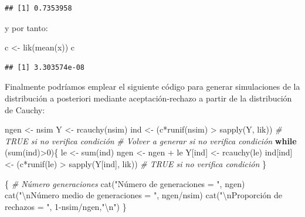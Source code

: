 \documentclass[
]{book}
\newenvironment{Shaded}{\begin{snugshade}}{\end{snugshade}}
\newcommand{\CommentTok}[1]{\textcolor[rgb]{0.56,0.35,0.01}{\textit{#1}}}
\newcommand{\ControlFlowTok}[1]{\textcolor[rgb]{0.13,0.29,0.53}{\textbf{#1}}}
\newcommand{\DecValTok}[1]{\textcolor[rgb]{0.00,0.00,0.81}{#1}}
\newcommand{\FunctionTok}[1]{\textcolor[rgb]{0.00,0.00,0.00}{#1}}
\newcommand{\NormalTok}[1]{#1}
\newcommand{\OtherTok}[1]{\textcolor[rgb]{0.56,0.35,0.01}{#1}}
\newcommand{\SpecialCharTok}[1]{\textcolor[rgb]{0.00,0.00,0.00}{#1}}
\newcommand{\StringTok}[1]{\textcolor[rgb]{0.31,0.60,0.02}{#1}}
\theoremstyle{break}
\theoremstyle{definition}
\theoremstyle{definition}
\theoremstyle{definition}
\theoremstyle{definition}
\theoremstyle{remark}
\begin{document}
\begin{enumerate}
\begin{verbatim}
## [1] 0.7353958
\end{verbatim}

  y por tanto:

\begin{Shaded}
\begin{Highlighting}[]
\NormalTok{c }\OtherTok{\textless{}{-}} \FunctionTok{lik}\NormalTok{(}\FunctionTok{mean}\NormalTok{(x))}
\NormalTok{c    }
\end{Highlighting}
\end{Shaded}

\begin{verbatim}
## [1] 3.303574e-08
\end{verbatim}

  Finalmente podríamos emplear el siguiente código para generar simulaciones de la distribución a posteriori mediante aceptación-rechazo a partir de la distribución de Cauchy:

\begin{Shaded}
\begin{Highlighting}[]
\NormalTok{ngen }\OtherTok{\textless{}{-}}\NormalTok{ nsim}
\NormalTok{Y }\OtherTok{\textless{}{-}} \FunctionTok{rcauchy}\NormalTok{(nsim)}
\NormalTok{ind }\OtherTok{\textless{}{-}}\NormalTok{ (c}\SpecialCharTok{*}\FunctionTok{runif}\NormalTok{(nsim) }\SpecialCharTok{\textgreater{}} \FunctionTok{sapply}\NormalTok{(Y, lik)) }\CommentTok{\# TRUE si no verifica condición}
\CommentTok{\# Volver a generar si no verifica condición}
\ControlFlowTok{while}\NormalTok{ (}\FunctionTok{sum}\NormalTok{(ind)}\SpecialCharTok{\textgreater{}}\DecValTok{0}\NormalTok{)\{}
\NormalTok{  le }\OtherTok{\textless{}{-}} \FunctionTok{sum}\NormalTok{(ind)}
\NormalTok{  ngen }\OtherTok{\textless{}{-}}\NormalTok{ ngen }\SpecialCharTok{+}\NormalTok{ le}
\NormalTok{  Y[ind] }\OtherTok{\textless{}{-}} \FunctionTok{rcauchy}\NormalTok{(le)}
\NormalTok{  ind[ind] }\OtherTok{\textless{}{-}}\NormalTok{ (c}\SpecialCharTok{*}\FunctionTok{runif}\NormalTok{(le) }\SpecialCharTok{\textgreater{}} \FunctionTok{sapply}\NormalTok{(Y[ind], lik)) }\CommentTok{\# TRUE si no verifica condición}
\NormalTok{\}}

\NormalTok{\{ }\CommentTok{\# Número generaciones}
  \FunctionTok{cat}\NormalTok{(}\StringTok{"Número de generaciones = "}\NormalTok{, ngen)}
  \FunctionTok{cat}\NormalTok{(}\StringTok{"}\SpecialCharTok{\textbackslash{}n}\StringTok{Número medio de generaciones = "}\NormalTok{, ngen}\SpecialCharTok{/}\NormalTok{nsim)}
  \FunctionTok{cat}\NormalTok{(}\StringTok{"}\SpecialCharTok{\textbackslash{}n}\StringTok{Proporción de rechazos = "}\NormalTok{, }\DecValTok{1}\SpecialCharTok{{-}}\NormalTok{nsim}\SpecialCharTok{/}\NormalTok{ngen,}\StringTok{"}\SpecialCharTok{\textbackslash{}n}\StringTok{"}\NormalTok{)}
\NormalTok{\}}
\end{Highlighting}
\end{Shaded}


\end{enumerate}
\end{document}
